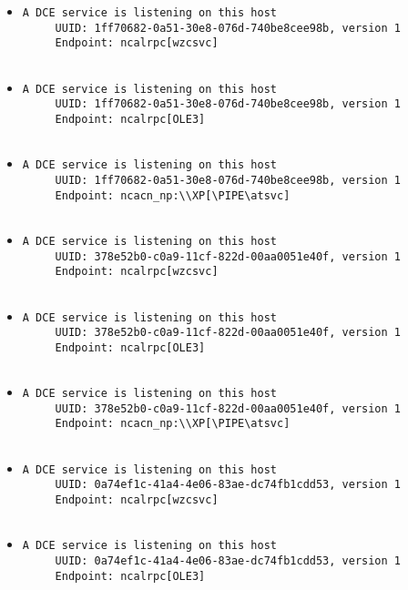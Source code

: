 \documentclass{article}
\begin{document}
\begin{itemize}
\item \begin{verbatim}
A DCE service is listening on this host
     UUID: 1ff70682-0a51-30e8-076d-740be8cee98b, version 1
     Endpoint: ncalrpc[wzcsvc]


\end{verbatim}\item \begin{verbatim}
A DCE service is listening on this host
     UUID: 1ff70682-0a51-30e8-076d-740be8cee98b, version 1
     Endpoint: ncalrpc[OLE3]


\end{verbatim}\item \begin{verbatim}
A DCE service is listening on this host
     UUID: 1ff70682-0a51-30e8-076d-740be8cee98b, version 1
     Endpoint: ncacn_np:\\XP[\PIPE\atsvc]


\end{verbatim}\item \begin{verbatim}
A DCE service is listening on this host
     UUID: 378e52b0-c0a9-11cf-822d-00aa0051e40f, version 1
     Endpoint: ncalrpc[wzcsvc]


\end{verbatim}\item \begin{verbatim}
A DCE service is listening on this host
     UUID: 378e52b0-c0a9-11cf-822d-00aa0051e40f, version 1
     Endpoint: ncalrpc[OLE3]


\end{verbatim}\item \begin{verbatim}
A DCE service is listening on this host
     UUID: 378e52b0-c0a9-11cf-822d-00aa0051e40f, version 1
     Endpoint: ncacn_np:\\XP[\PIPE\atsvc]


\end{verbatim}\item \begin{verbatim}
A DCE service is listening on this host
     UUID: 0a74ef1c-41a4-4e06-83ae-dc74fb1cdd53, version 1
     Endpoint: ncalrpc[wzcsvc]


\end{verbatim}\item \begin{verbatim}
A DCE service is listening on this host
     UUID: 0a74ef1c-41a4-4e06-83ae-dc74fb1cdd53, version 1
     Endpoint: ncalrpc[OLE3]



\end{verbatim}
\end{itemize}
\end{document}
